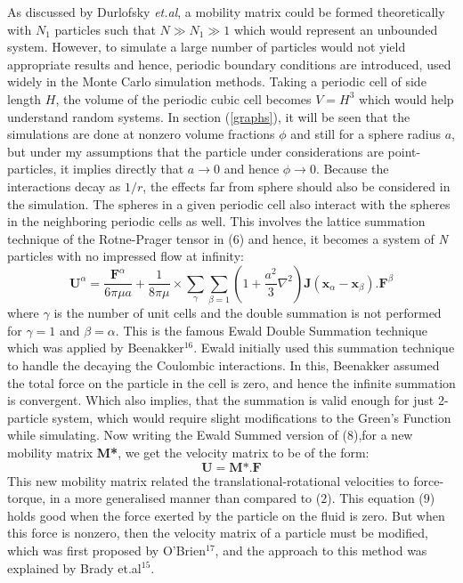 \documentclass[12pt]{article}
\begin{document}
As discussed by Durlofsky \textit{et.al}, a mobility matrix could be formed theoretically with $N_1$ particles such that $N \gg N_1\gg 1$ which would represent an unbounded system. However, to simulate a large number of particles would not yield appropriate results and hence, periodic boundary conditions are introduced, used widely in the Monte Carlo simulation methods. Taking a periodic cell of side length $H$, the volume of the periodic cubic cell becomes $V=H^3$ which would help understand random systems. In section (\ref{graphs}), it will be seen that the simulations are done at nonzero volume fractions $\phi$ and still for a sphere radius $a$, but under my assumptions that the particle under considerations are point-particles, it implies directly that $a \rightarrow 0$ and hence $\phi \rightarrow 0$. Because the interactions decay as $1/r$, the effects far from sphere should also be considered in the simulation. The spheres in a given periodic cell also interact with the spheres in the neighboring periodic cells as well. This involves the lattice summation technique of the Rotne-Prager tensor in ($6$) and hence, it becomes a system of \textit{N} particles with no impressed flow at infinity:
\begin{equation}
\label{eq8}
\textbf{U}^{\alpha}=\frac{\textbf{F}^{\alpha}}{6 \pi \mu a}+\frac{1}{8 \pi \mu} \times \sum_{\gamma} \sum_{\beta=1} \left(1+\frac{a^2}{3} \nabla^2 \right)\textbf{J}(\textbf{x}_{\alpha} - \textbf{x}_{\beta}).\textbf{F}^{\beta}
\end{equation}
where $\gamma$ is the number of unit cells and the double summation is not performed for $\gamma=1$ and $\beta=\alpha$.  
This is the famous Ewald Double Summation technique which was applied by Beenakker$^{16}$. Ewald initially used this summation technique to handle the decaying the Coulombic interactions. In this, Beenakker assumed the total force on the particle in the cell is zero, and hence the infinite summation is convergent. Which also implies, that the summation is valid enough for just 2-particle system, which would require slight modifications to the Green's Function while simulating. Now writing the Ewald Summed version of ($8$),for a new mobility matrix \textbf{M*}, we get the velocity matrix to be of the form:
\begin{equation}
\label{eq9}
\textbf{U}=\textbf{M*}.\textbf{F}
\end{equation}
This new mobility matrix related the translational-rotational velocities to force-torque, in a more generalised manner than compared to ($2$). This equation ($9$) holds good when the force exerted by the particle on the fluid is zero. But when this force is nonzero, then the velocity matrix of a particle must be modified, which was first proposed by O'Brien$^{17}$, and the approach to this method was explained by Brady et.al$^{15}$.
\end{document}
